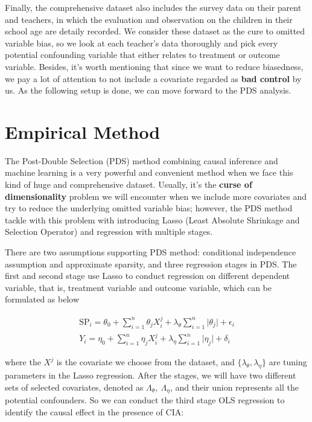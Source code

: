 \documentclass[]{AEA}
\begin{document}
\begin{figure}
    \end{figure}

    Finally, the comprehensive dataset also includes the survey data on their parent and teachers, in which the evaluation and observation on the children in their school age are detaily recorded.  We consider these dataset as the cure to omitted variable bias, so we look at each teacher's data thoroughly and pick every potential confounding variable that either relates to treatment or outcome variable.  Besides, it's worth mentioning that since we want to reduce biasedness, we pay a lot of attention to not include a covariate regarded as \textbf{bad control} by us.  As the following setup is done, we can move forward to the PDS analysis.


\section{Empirical Method} %

    The Post-Double Selection (PDS) method combining causal inference and machine learning is a very powerful and convenient method when we face this kind of huge and comprehensive dataset.  Usually, it's the \textbf{curse of dimensionality} problem we will encounter when we include more covariates and try to reduce the underlying omitted variable bias; however, the PDS method tackle with this problem with introducing Lasso (Least Absolute Shrinkage and Selection Operator) and regression with multiple stages.

    There are two assumptions supporting PDS method: conditional independence assumption and approximate sparsity, and three regression stages in PDS.  The first and second stage use Lasso to conduct regression on different dependent variable, that is, treatment variable and outcome variable, which can be formulated as below

    \begin{align}
    \text{SP}_i = \theta_0 + \sum_{i=1}^n \theta_j X_i^j + \lambda_\theta\sum_{i=1}^n \lvert \theta_j \rvert + \epsilon_i \\
    Y_i         = \eta_0   + \sum_{i=1}^n \eta_j X_i^j   + \lambda_\eta\sum_{i=1}^n \lvert \eta_j   \rvert + \delta_i
    \end{align}

    where the $X^j$ is the covariate we choose from the dataset, and $\{\lambda_\theta,\lambda_\eta\}$ are tuning parameters in the Lasso regression.  After the stages, we will have two different sets of selected covariates, denoted as $\Lambda_\theta,\ \Lambda_\eta$, and their union represents all the potential confounders.  So we can conduct the third stage OLS regression to identify the causal effect in the presence of CIA:
\end{document}
